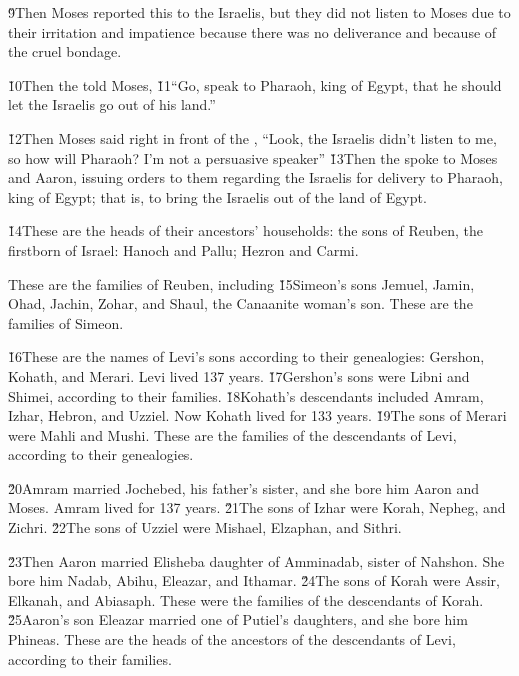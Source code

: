 \v{9}Then Moses reported this to the Israelis, but they did not listen to Moses due to their irritation and impatience because there was no deliverance and because of the cruel bondage.

\v{10}Then the  told Moses, \v{11}``Go, speak to Pharaoh, king of Egypt, that he should let the Israelis go out of his land.''

\v{12}Then Moses said right in front of the , ``Look, the Israelis didn't listen to me, so how will Pharaoh? I'm not a persuasive speaker'' \v{13}Then the  spoke to Moses and Aaron, issuing orders to them regarding the Israelis for delivery to Pharaoh, king of Egypt; that is, to bring the Israelis out of the land of Egypt.

\v{14}These are the heads of their ancestors' households: the sons of Reuben, the firstborn of Israel: Hanoch and Pallu; Hezron and Carmi.

These are the families of Reuben, including \v{15}Simeon's sons Jemuel, Jamin, Ohad, Jachin, Zohar, and Shaul, the Canaanite woman's son. These are the families of Simeon.

\v{16}These are the names of Levi's sons according to their genealogies: Gershon, Kohath, and Merari. Levi lived 137 years. \v{17}Gershon's sons were Libni and Shimei, according to their families. \v{18}Kohath's descendants included Amram, Izhar, Hebron, and Uzziel. Now Kohath lived for 133 years. \v{19}The sons of Merari were Mahli and Mushi. These are the families of the descendants of Levi, according to their genealogies.

\v{20}Amram married Jochebed, his father's sister, and she bore him Aaron and Moses. Amram lived for 137 years. \v{21}The sons of Izhar were Korah, Nepheg, and Zichri. \v{22}The sons of Uzziel were Mishael, Elzaphan, and Sithri.

\v{23}Then Aaron married Elisheba daughter of Amminadab, sister of Nahshon. She bore him Nadab, Abihu, Eleazar, and Ithamar. \v{24}The sons of Korah were Assir, Elkanah, and Abiasaph. These were the families of the descendants of Korah. \v{25}Aaron's son Eleazar married one of Putiel's daughters, and she bore him Phineas. These are the heads of the ancestors of the descendants of Levi, according to their families.

